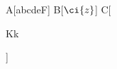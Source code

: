 \documentclass{article}
\newcommand*\ca[-1]{a}
\newcommand\cb[-2][d]{b}
\newcommand\cc{}
\renewcommand\cc[-1]{c}
\providecommand\cd[-1]{d}
\DeclareRobustCommand\ce[-1]{e}
\newenvironment{ef}[-1]{f}{}
\renewenvironment{ef}[-1]{F}{}
\begin{document}
A[\ca\cb\cc\cd\ce\begin{ef}\end{ef}\cg\ch\cl] B[$\ci{z}$]
C[\begin{tabular}{K}k\end{tabular}]
\end{document}
